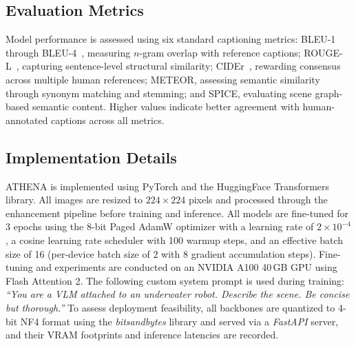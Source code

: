 \subsection*{Evaluation Metrics}
Model performance is assessed using six standard captioning metrics: BLEU-1 through BLEU-4~\cite{bleu}, measuring $n$-gram overlap with reference captions; ROUGE-L~\cite{rouge}, capturing sentence-level structural similarity; CIDEr~\cite{cider}, rewarding consensus across multiple human references; METEOR, assessing semantic similarity through synonym matching and stemming; and SPICE, evaluating scene graph-based semantic content. Higher values indicate better agreement with human-annotated captions across all metrics.

\subsection*{Implementation Details}
ATHENA is implemented using PyTorch and the HuggingFace Transformers library. All images are resized to $224 \times 224$ pixels and processed through the enhancement pipeline before training and inference. All models are fine-tuned for 3 epochs using the 8-bit Paged AdamW optimizer with a learning rate of $2 \times 10^{-4}$, a cosine learning rate scheduler with 100 warmup steps, and an effective batch size of 16 (per-device batch size of 2 with 8 gradient accumulation steps). Fine-tuning and experiments are conducted on an NVIDIA A100 40\,GB GPU using Flash Attention 2. The following custom system prompt is used during training: \textit{``You are a VLM attached to an underwater robot. Describe the scene. Be concise but thorough.''} To assess deployment feasibility, all backbones are quantized to 4-bit NF4 format using the \textit{bitsandbytes} library and served via a \textit{FastAPI} server, and their VRAM footprints and inference latencies are recorded.
